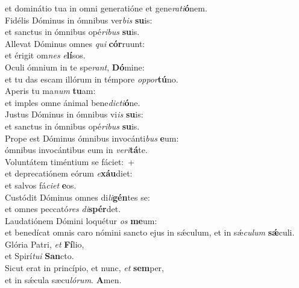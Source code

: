 \oddverse et dominátio tua in omni generatióne et gene\textit{ra}\textit{ti}\textbf{ó}nem.\\
\evenverse Fidélis Dóminus in ómnibus ver\textit{bis} \textbf{su}is:~\*\\
\evenverse et sanctus in ómnibus opé\textit{ri}\textit{bus} \textbf{su}is.\\
\oddverse Allevat Dóminus omnes \textit{qui} \textbf{cór}ruunt:~\*\\
\oddverse et érigit om\textit{nes} \textit{e}\textbf{lí}sos.\\
\evenverse Oculi ómnium in te spe\textit{rant}, \textbf{Dó}mine:~\*\\
\evenverse et tu das escam illórum in témpore \textit{op}\textit{por}\textbf{tú}no.\\
\oddverse Aperis tu ma\textit{num} \textbf{tu}am:~\*\\
\oddverse et imples omne ánimal bene\textit{di}\textit{cti}\textbf{ó}ne.\\
\evenverse Justus Dóminus in ómnibus vi\textit{is} \textbf{su}is:~\*\\
\evenverse et sanctus in ómnibus opé\textit{ri}\textit{bus} \textbf{su}is.\\
\oddverse Prope est Dóminus ómnibus invocánti\textit{bus} \textbf{e}um:~\*\\
\oddverse ómnibus invocántibus eum in \textit{ve}\textit{ri}\textbf{tá}te.\\
\evenverse Voluntátem timéntium se fáciet:~+\\
\evenverse  et deprecatiónem eórum \textit{e}\textbf{xáu}diet:~\*\\
\evenverse et salvos fá\textit{ci}\textit{et} \textbf{e}os.\\
\oddverse Custódit Dóminus omnes di\textit{li}\textbf{gén}tes se:~\*\\
\oddverse et omnes peccató\textit{res} \textit{di}\textbf{spér}det.\\
\evenverse Laudatiónem Dómini loquétur \textit{os} \textbf{me}um:~\*\\
\evenverse et benedícat omnis caro nómini sancto ejus in sǽculum, et in sǽ\textit{cu}\textit{lum} \textbf{sǽ}culi.\\
\oddverse Glória Patri, \textit{et} \textbf{Fí}lio,~\*\\
\oddverse et Spirí\textit{tu}\textit{i} \textbf{San}cto.\\
\evenverse Sicut erat in princípio, et nunc, \textit{et} \textbf{sem}per,~\*\\
\evenverse et in sǽcula sæcu\textit{ló}\textit{rum}. \textbf{A}men.\\
